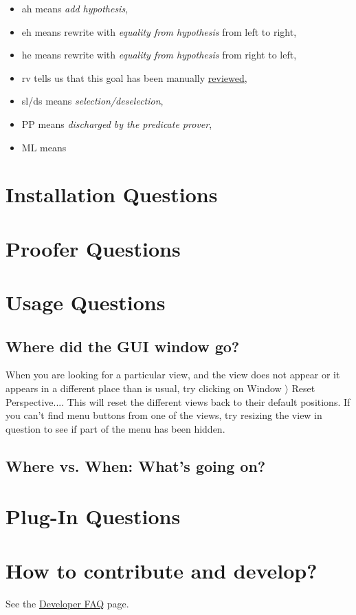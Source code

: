 \begin{itemize}
	\item \textsf{ah} means \textit{add hypothesis},
	\item \textsf{eh} means rewrite with \textit{equality from hypothesis} from left to right,
	\item \textsf{he} means rewrite with \textit{equality from hypothesis} from right to left,
	\item \textsf{rv} tells us that this goal has been manually \href{http://wiki.event-b.org/index.php/The_Proving_Perspective_(Rodin_User_Manual)#The_Proof_Control_Window}{reviewed},
	\item \textsf{sl/ds} means \textit{selection/deselection},
	\item \textsf{PP} means \textit{discharged by the predicate prover},
	\item \textsf{ML} means 
\end{itemize}

\section{Installation Questions}

\section{Proofer Questions}

\section{Usage Questions}

\subsection{Where did the GUI window go?}

When you are looking for a particular view, and the view does not appear or it appears in a different place than is usual, try clicking on \textsf{Window $\rangle $ Reset Perspective...}. This will reset the different views back to their default positions. If you can't find menu buttons from one of the views, try resizing the view in question to see if part of the menu has been hidden.

\subsection{Where vs. When: What's going on?}

\section{Plug-In Questions}

\section{How to contribute and develop?}

See the \href{http://wiki.event-b.org/index.php/Developer_FAQ}{Developer FAQ} page.
